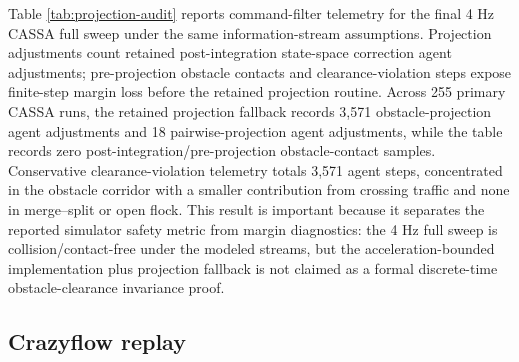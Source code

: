 \documentclass[11pt]{article}
\begin{document}
Table \ref{tab:projection-audit} reports command-filter telemetry for the final 4 Hz CASSA full sweep under the same information-stream assumptions. Projection adjustments count retained post-integration state-space correction agent adjustments; pre-projection obstacle contacts and clearance-violation steps expose finite-step margin loss before the retained projection routine. Across 255 primary CASSA runs, the retained projection fallback records 3,571 obstacle-projection agent adjustments and 18 pairwise-projection agent adjustments, while the table records zero post-integration/pre-projection obstacle-contact samples. Conservative clearance-violation telemetry totals 3,571 agent steps, concentrated in the obstacle corridor with a smaller contribution from crossing traffic and none in merge--split or open flock. This result is important because it separates the reported simulator safety metric from margin diagnostics: the 4 Hz full sweep is collision/contact-free under the modeled streams, but the acceleration-bounded implementation plus projection fallback is not claimed as a formal discrete-time obstacle-clearance invariance proof.



\subsection{Crazyflow replay}
\end{document}
